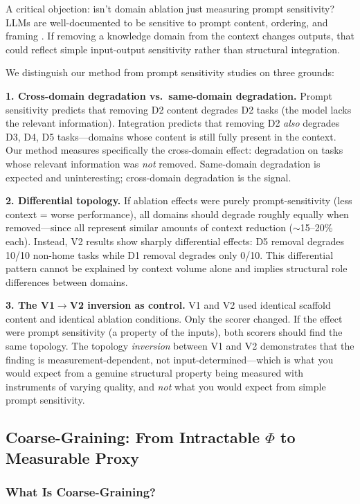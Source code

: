 \documentclass[12pt,letterpaper]{article}
\begin{document}
A critical objection: isn't domain ablation just measuring prompt sensitivity? LLMs are well-documented to be sensitive to prompt content, ordering, and framing \citep{lu2022prompts, zhao2021calibrate, liu2024lost}. If removing a knowledge domain from the context changes outputs, that could reflect simple input-output sensitivity rather than structural integration.

We distinguish our method from prompt sensitivity studies on three grounds:

\textbf{1. Cross-domain degradation vs.\ same-domain degradation.} Prompt sensitivity predicts that removing D2 content degrades D2 tasks (the model lacks the relevant information). Integration predicts that removing D2 \emph{also} degrades D3, D4, D5 tasks---domains whose content is still fully present in the context. Our method measures specifically the cross-domain effect: degradation on tasks whose relevant information was \emph{not} removed. Same-domain degradation is expected and uninteresting; cross-domain degradation is the signal.

\textbf{2. Differential topology.} If ablation effects were purely prompt-sensitivity (less context = worse performance), all domains should degrade roughly equally when removed---since all represent similar amounts of context reduction ($\sim$15--20\% each). Instead, V2 results show sharply differential effects: D5 removal degrades 10/10 non-home tasks while D1 removal degrades only 0/10. This differential pattern cannot be explained by context volume alone and implies structural role differences between domains.

\textbf{3. The V1$\to$V2 inversion as control.} V1 and V2 used identical scaffold content and identical ablation conditions. Only the scorer changed. If the effect were prompt sensitivity (a property of the inputs), both scorers should find the same topology. The topology \emph{inversion} between V1 and V2 demonstrates that the finding is measurement-dependent, not input-determined---which is what you would expect from a genuine structural property being measured with instruments of varying quality, and \emph{not} what you would expect from simple prompt sensitivity.

\subsection{Coarse-Graining: From Intractable $\Phi$ to Measurable Proxy}
\label{sec:coarsegraining}

\subsubsection{What Is Coarse-Graining?}
\end{document}
